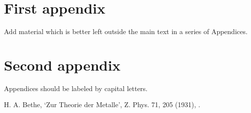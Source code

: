 \documentclass[submission]{SciPost}
\begin{document}
\begin{appendix}

\section{First appendix}
Add material which is better left outside the main text in a series of Appendices.

\section{Second appendix}
Appendices should be labeled by capital letters.

\end{appendix}

\begin{thebibliography}{99}
 H. A. Bethe, `Zur Theorie der Metalle', Z. Phys. 71, 205 (1931), .
\end{thebibliography}

\nolinenumbers
\end{document}
